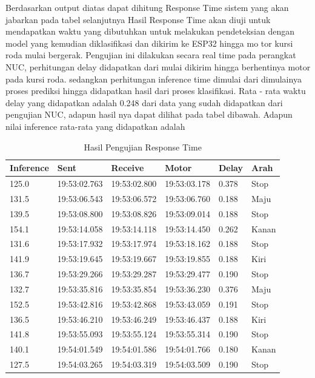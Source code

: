 Berdasarkan output diatas dapat dihitung Response Time sistem yang akan jabarkan pada tabel selanjutnya Hasil Response Time akan diuji untuk mendapatkan waktu yang dibutuhkan untuk melakukan pendeteksian dengan model yang kemudian diklasifikasi dan dikirim ke ESP32 hingga mo tor kursi roda mulai bergerak. Pengujian ini dilakukan secara real time pada perangkat NUC, perhitungan delay didapatkan dari mulai dikirim hingga berhentinya motor pada kursi roda. sedangkan perhitungan inference time dimulai dari dimulainya proses prediksi hingga didapatkan hasil dari proses klasifikasi. Rata - rata waktu delay yang didapatkan adalah 0.248 dari data yang sudah didapatkan dari pengujian NUC, adapun hasil nya dapat dilihat pada tabel dibawah. Adapun nilai inference rata-rata yang didapatkan adalah 
\begin{table}[H]
    \caption{Hasil Pengujian Response Time}
    \centering
    \begin{tabular}{|l|l|l|l|l|l|}
    \hline
        Inference & Sent & Receive & Motor & Delay & Arah \\ \hline
        125.0 & 19:53:02.763 & 19:53:02.800 & 19:53:03.178 & 0.378 & Stop \\ \hline
        131.5 & 19:53:06.543 & 19:53:06.572 & 19:53:06.760 & 0.188 & Maju \\ \hline
        139.5 & 19:53:08.800 & 19:53:08.826 & 19:53:09.014 & 0.188 & Stop \\ \hline
        154.1 & 19:53:14.058 & 19:53:14.118 & 19:53:14.450 & 0.262 & Kanan \\ \hline
        131.6 & 19:53:17.932 & 19:53:17.974 & 19:53:18.162 & 0.188 & Stop \\ \hline
        141.9 & 19:53:19.645 & 19:53:19.667 & 19:53:19.855 & 0.188 & Kiri \\ \hline
        136.7 & 19:53:29.266 & 19:53:29.287 & 19:53:29.477 & 0.190 & Stop \\ \hline
        132.7 & 19:53:35.816 & 19:53:35.854 & 19:53:36.230 & 0.376 & Maju \\ \hline
        152.5 & 19:53:42.816 & 19:53:42.868 & 19:53:43.059 & 0.191 & Stop \\ \hline
        136.5 & 19:53:46.210 & 19:53:46.249 & 19:53:46.437 & 0.188 & Kiri \\ \hline
        141.8 & 19:53:55.093 & 19:53:55.124 & 19:53:55.314 & 0.190 & Stop \\ \hline
        140.1 & 19:54:01.549 & 19:54:01.586 & 19:54:01.766 & 0.180 & Kanan \\ \hline
        127.5 & 19:54:03.265 & 19:54:03.319 & 19:54:03.509 & 0.190 & Stop \\ \hline

\end{tabular}
\end{table}
